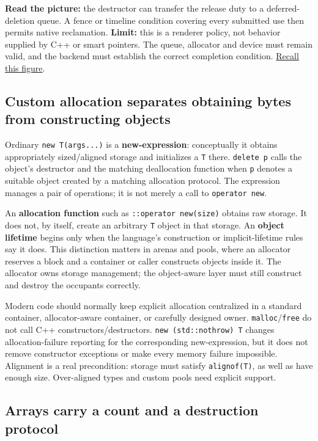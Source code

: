 \textbf{Read the picture:} the destructor can transfer the release duty to a deferred-deletion queue. A fence or timeline condition covering every submitted use then permits native reclamation. \textbf{Limit:} this is a renderer policy, not behavior supplied by C++ or smart pointers. The queue, allocator and device must remain valid, and the backend must establish the correct completion condition. \hyperref[appendix-960160274237-four-figure-briefs]{Recall this figure}.

\subsection{Custom allocation separates obtaining bytes from constructing objects}\label{05-engine-i-ch004-custom-allocation-separates-obtaining-bytes-from-constructing-objects}

Ordinary \texttt{new\ T(args...)} is a \textbf{new-expression}: conceptually it obtains appropriately sized/aligned storage and initializes a \texttt{T} there. \texttt{delete\ p} calls the object's destructor and the matching deallocation function when \texttt{p} denotes a suitable object created by a matching allocation protocol. The expression manages a pair of operations; it is not merely a call to \texttt{operator\ new}.

An \textbf{allocation function} such as \texttt{::operator\ new(size)} obtains raw storage. It does not, by itself, create an arbitrary \texttt{T} object in that storage. An \textbf{object lifetime} begins only when the language's construction or implicit-lifetime rules say it does. This distinction matters in arenas and pools, where an allocator reserves a block and a container or caller constructs objects inside it. The allocator owns storage management; the object-aware layer must still construct and destroy the occupants correctly.

Modern code should normally keep explicit allocation centralized in a standard container, allocator-aware container, or carefully designed owner. \texttt{malloc}/\texttt{free} do not call C++ constructors/destructors. \texttt{new\ (std::nothrow)\ T} changes allocation-failure reporting for the corresponding new-expression, but it does not remove constructor exceptions or make every memory failure impossible. Alignment is a real precondition: storage must satisfy \texttt{alignof(T)}, as well as have enough size. Over-aligned types and custom pools need explicit support.

\subsection{Arrays carry a count and a destruction protocol}\label{05-engine-i-ch004-arrays-carry-a-count-and-a-destruction-protocol}

